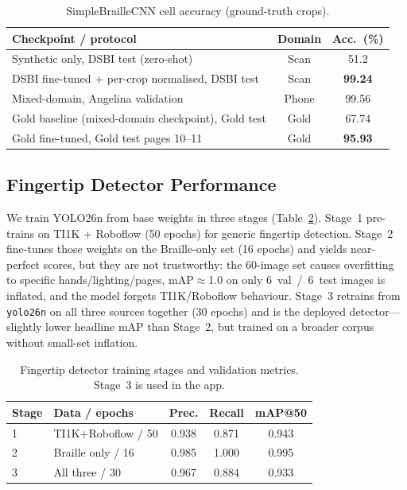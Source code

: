 \documentclass{article}
\begin{document}
\begin{table}[t]
    \centering
    \caption{SimpleBrailleCNN cell accuracy (ground-truth crops).}
    \label{tab:cnn}
    \begin{tabular}{lcc}
        \toprule
        Checkpoint / protocol & Domain & Acc.\ (\%) \\
        \midrule
        Synthetic only, DSBI test (zero-shot) & Scan & 51.2 \\
        DSBI fine-tuned + per-crop normalised, DSBI test & Scan & \textbf{99.24} \\
        Mixed-domain, Angelina validation & Phone & 99.56 \\
        Gold baseline (mixed-domain checkpoint), Gold test & Gold & 67.74 \\
        Gold fine-tuned, Gold test pages 10--11 & Gold & \textbf{95.93} \\
        \bottomrule
    \end{tabular}
\end{table}

\subsection{Fingertip Detector Performance}

We train YOLO26n from base weights in three stages
(Table~\ref{tab:tip-stages}).  Stage~1 pre-trains on TI1K + Roboflow
(50 epochs) for generic fingertip detection.  Stage~2 fine-tunes those
weights on the Braille-only set (16 epochs) and yields near-perfect
scores, but they are not trustworthy: the 60-image set causes
overfitting to specific hands/lighting/pages, mAP$\approx$1.0 on only
6~val~/~6~test images is inflated, and the model forgets TI1K/Roboflow
behaviour.  Stage~3 retrains from \texttt{yolo26n} on all three sources
together (30 epochs) and is the deployed detector---slightly lower
headline mAP than Stage~2, but trained on a broader corpus without
small-set inflation.

\begin{table}[h]
  \caption{Fingertip detector training stages and validation metrics.
  Stage~3 is used in the app.}
  \label{tab:tip-stages}
  \centering
  \begin{tabular}{llccc}
    \toprule
    Stage & Data / epochs & Prec. & Recall & mAP@50 \\
    \midrule
    1 & TI1K+Roboflow / 50 & 0.938 & 0.871 & 0.943 \\
    2 & Braille only / 16 & 0.985 & 1.000 & 0.995 \\
    3 & All three / 30 & 0.967 & 0.884 & 0.933 \\
    \bottomrule
  \end{tabular}
\end{table}
\end{document}
